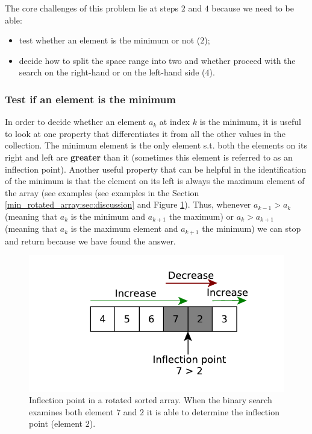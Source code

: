 The core challenges of this problem lie at steps $2$ and $4$ because we need to be able:
\begin{itemize}
	\item  test whether an element is the minimum or not ($2$);
	\item decide how to split the space range into two and whether proceed with the search on the right-hand or on the left-hand side ($4$).
\end{itemize}

\subsubsection{Test if an element is the minimum}

In order to decide whether an element $a_k$ at index $k$ is the minimum, it is useful to look at one property that differentiates it from all the other values in the collection.
The minimum element is the only element s.t. both the elements on its right and left are \textbf{greater} than it (sometimes this element is referred to as an inflection point). 
Another useful property that can be helpful in the identification of the minimum is that the element on its left is always the maximum element of the array (see examples (see examples in the Section \ref{min_rotated_array:sec:discussion} and Figure \ref{fig:min_rotated_array:test_element}).
Thus, whenever $a_{k-1} > a_{k}$ (meaning that $a_k$ is the minimum and $a_{k+1}$ the maximum) or $a_{k} > a_{k+1}$ (meaning that $a_k$ is the maximum element and $a_{k+1}$ the minimum) we can stop and return because we have found the answer.

\begin{figure}
	\centering
	\includegraphics{sources/min_rotated_array/images/inflection_point}
	\caption{Inflection point in a rotated sorted array. When the binary search examines both element $7$ and $2$ it is able to determine the inflection point (element $2$). }
	\label{fig:min_rotated_array:test_element}
\end{figure}

